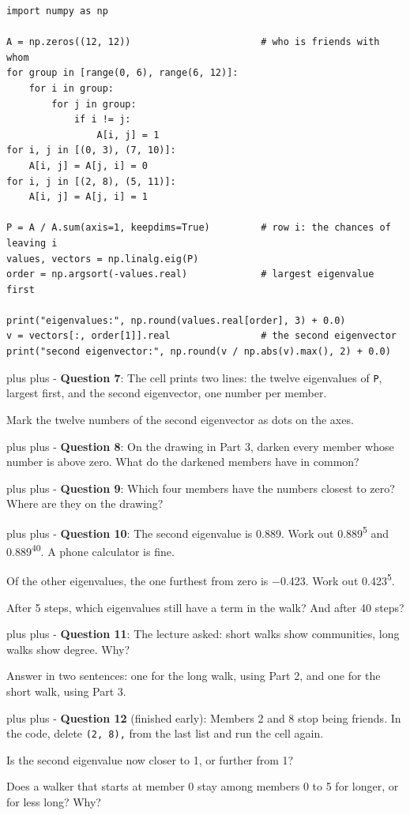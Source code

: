 \documentclass[a4paper, 14pt]{extarticle}
\newcommand{\needroom}[1]{%
  \par
  \begingroup
    \setlength{\dimen0}{#1}%
    \vskip 0pt plus \dimen0
    \penalty -100%
    \vskip 0pt plus -\dimen0
  \endgroup}
\begin{document}
\vspace{-0.3em}
{\small
\begin{verbatim}
import numpy as np

A = np.zeros((12, 12))                       # who is friends with whom
for group in [range(0, 6), range(6, 12)]:
    for i in group:
        for j in group:
            if i != j:
                A[i, j] = 1
for i, j in [(0, 3), (7, 10)]:
    A[i, j] = A[j, i] = 0
for i, j in [(2, 8), (5, 11)]:
    A[i, j] = A[j, i] = 1

P = A / A.sum(axis=1, keepdims=True)         # row i: the chances of leaving i
values, vectors = np.linalg.eig(P)
order = np.argsort(-values.real)             # largest eigenvalue first

print("eigenvalues:", np.round(values.real[order], 3) + 0.0)
v = vectors[:, order[1]].real                # the second eigenvector
print("second eigenvector:", np.round(v / np.abs(v).max(), 2) + 0.0)
\end{verbatim}
}

\needroom{14\baselineskip}%
{\bf Question 7}: The cell prints two lines: the twelve eigenvalues of
\texttt{P}, largest first, and the second eigenvector, one number per member.

Mark the twelve numbers of the second eigenvector as dots on the axes.

\begin{center}
\resizebox{0.9\textwidth}{!}{\eigaxes{}}
\end{center}

\needroom{4\baselineskip}%
{\bf Question 8}: On the drawing in Part 3, darken every member whose number is
above zero. What do the darkened members have in common?

\needroom{3\baselineskip}%
{\bf Question 9}: Which four members have the numbers closest to zero? Where
are they on the drawing?

\needroom{6\baselineskip}%
{\bf Question 10}: The second eigenvalue is 0.889. Work out
0.889\textsuperscript{5} and 0.889\textsuperscript{40}. A phone calculator is
fine.

Of the other eigenvalues, the one furthest from zero is $-$0.423. Work out
0.423\textsuperscript{5}.

After 5 steps, which eigenvalues still have a term in the walk? And after 40
steps?

\needroom{4\baselineskip}%
{\bf Question 11}: The lecture asked: short walks show communities, long walks
show degree. Why?

Answer in two sentences: one for the long walk, using Part 2, and one for the
short walk, using Part 3.

\needroom{6\baselineskip}%
{\bf Question 12} (finished early): Members 2 and 8 stop being friends. In the
code, delete \texttt{(2, 8),} from the last list and run the cell again.

Is the second eigenvalue now closer to 1, or further from 1?

Does a walker that starts at member 0 stay among members 0 to 5 for longer, or
for less long? Why?
\end{document}
